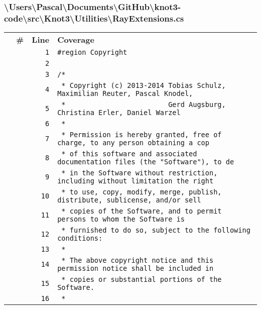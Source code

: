 \documentclass[a4paper,10pt]{article}
\begin{document}
\subsubsection{\textbackslash Users\textbackslash Pascal\textbackslash Documents\textbackslash GitHub\textbackslash knot3-code\textbackslash src\textbackslash Knot3\textbackslash Utilities\textbackslash RayExtensions.cs}
\begin{longtable}[l]{lrrl}
\textbf{} & \textbf{\#} & \textbf{Line} & \textbf{Coverage}\\
\cellcolor{gray} &  & \verb~1~ & \verb~#region Copyright~\\
\cellcolor{gray} &  & \verb~2~ & \verb~~\\
\cellcolor{gray} &  & \verb~3~ & \verb~/*~\\
\cellcolor{gray} &  & \verb~4~ & \verb~ * Copyright (c) 2013-2014 Tobias Schulz, Maximilian Reuter, Pascal Knodel,~\\
\cellcolor{gray} &  & \verb~5~ & \verb~ *                         Gerd Augsburg, Christina Erler, Daniel Warzel~\\
\cellcolor{gray} &  & \verb~6~ & \verb~ *~\\
\cellcolor{gray} &  & \verb~7~ & \verb~ * Permission is hereby granted, free of charge, to any person obtaining a cop~\\
\cellcolor{gray} &  & \verb~8~ & \verb~ * of this software and associated documentation files (the "Software"), to de~\\
\cellcolor{gray} &  & \verb~9~ & \verb~ * in the Software without restriction, including without limitation the right~\\
\cellcolor{gray} &  & \verb~10~ & \verb~ * to use, copy, modify, merge, publish, distribute, sublicense, and/or sell~\\
\cellcolor{gray} &  & \verb~11~ & \verb~ * copies of the Software, and to permit persons to whom the Software is~\\
\cellcolor{gray} &  & \verb~12~ & \verb~ * furnished to do so, subject to the following conditions:~\\
\cellcolor{gray} &  & \verb~13~ & \verb~ *~\\
\cellcolor{gray} &  & \verb~14~ & \verb~ * The above copyright notice and this permission notice shall be included in ~\\
\cellcolor{gray} &  & \verb~15~ & \verb~ * copies or substantial portions of the Software.~\\
\cellcolor{gray} &  & \verb~16~ & \verb~ *~\\

\end{longtable}
\end{document}
